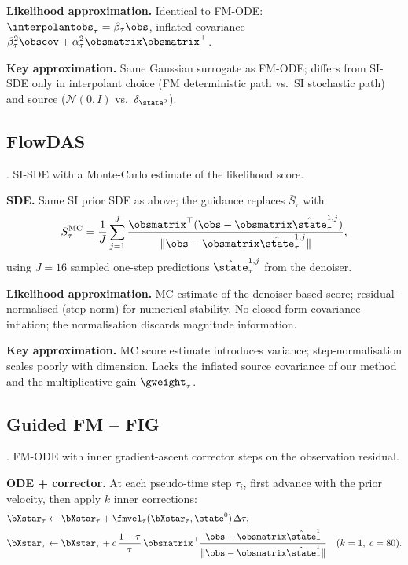 \textbf{Likelihood approximation.}
Identical to FM-ODE: $\interpolantobs_\tau=\beta_\tau\obs$, inflated covariance $\beta_\tau^2\obscov+\alpha_\tau^2\obsmatrix\obsmatrix^\top$.

\textbf{Key approximation.}
Same Gaussian surrogate as FM-ODE; differs from SI-SDE only in interpolant choice (FM deterministic path vs.\ SI stochastic path) and source ($\mathcal{N}(0,I)$ vs.\ $\delta_{\state^0}$).

\subsection{FlowDAS}\label{appendix:method:flowdas}

\cite{chen_flowdas_2025}. SI-SDE with a Monte-Carlo estimate of the likelihood score.

\textbf{SDE.}
Same SI prior SDE as above; the guidance replaces $\bar S_\tau$ with
\begin{align}
  \bar S_\tau^{\mathrm{MC}}
  = \frac{1}{J}\sum_{j=1}^{J}
    \frac{\obsmatrix^\top(\obs - \obsmatrix\hat{\state}^{1,j}_\tau)}
         {\|\obs - \obsmatrix\hat{\state}^{1,j}_\tau\|},
\end{align}
using $J=16$ sampled one-step predictions $\hat{\state}^{1,j}_\tau$ from the denoiser.

\textbf{Likelihood approximation.}
MC estimate of the denoiser-based score; residual-normalised (step-norm) for numerical stability.
No closed-form covariance inflation; the normalisation discards magnitude information.

\textbf{Key approximation.}
MC score estimate introduces variance; step-normalisation scales poorly with dimension.
Lacks the inflated source covariance of our method and the multiplicative gain $\gweight_\tau$.

\subsection{Guided FM -- FIG}\label{appendix:method:fig}

\cite{yan_fig_2025}. FM-ODE with inner gradient-ascent corrector steps on the observation residual.

\textbf{ODE + corrector.}
At each pseudo-time step $\tau_i$, first advance with the prior velocity, then apply $k$ inner corrections:
\begin{align}
  \bXstar_\tau &\leftarrow \bXstar_\tau + \fmvel_\tau(\bXstar_\tau,\state^0)\,\Delta\tau, \\
  \bXstar_\tau &\leftarrow \bXstar_\tau
    + c\,\frac{1-\tau}{\tau}\,\obsmatrix^\top
      \frac{\obs - \obsmatrix\hat{\state}^1_\tau}{\|\obs - \obsmatrix\hat{\state}^1_\tau\|}
  \quad (k=1,\; c=80).
\end{align}

